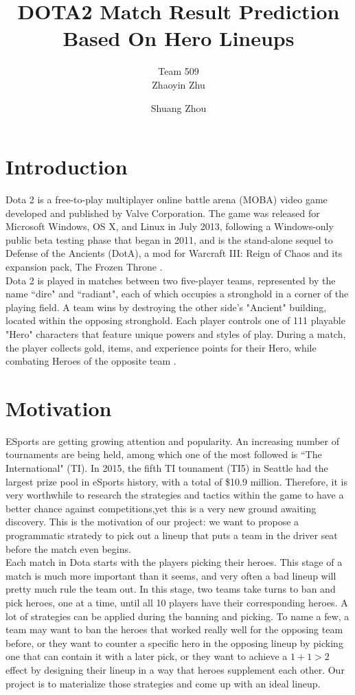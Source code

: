 \documentclass[11pt]{article}
\title{DOTA2 Match Result Prediction Based On Hero Lineups}
\author[1]{Team 509\\Zhaoyin Zhu}
\author[2]{Shuang Zhou}
\affil[1]{Division of Biostatistics, School of Medicine, New York University}
\affil[2]{Department of Computer Science, New York University}
\begin{document}
\maketitle

\section{Introduction}
Dota 2 is a free-to-play multiplayer online battle arena (MOBA) video game developed and published by Valve Corporation. The game was released for Microsoft Windows, OS X, and Linux in July 2013, following a Windows-only public beta testing phase that began in 2011, and is the stand-alone sequel to Defense of the Ancients (DotA), a mod for Warcraft III: Reign of Chaos and its expansion pack, The Frozen Throne \cite{dota2}.\\

\noindent Dota 2 is played in matches between two five-player teams, represented by the name ``dire" and ``radiant", each of which occupies a stronghold in a corner of the playing field. A team wins by destroying the other side's "Ancient" building, located within the opposing stronghold. Each player controls one of 111 playable "Hero" characters that feature unique powers and styles of play. During a match, the player collects gold, items, and experience points for their Hero, while combating Heroes of the opposite team \cite{dota2}.

\section{Motivation}
ESports are getting growing attention and popularity. An increasing number of tournaments are being held, among which one of the most followed is ``The International" (TI). In 2015, the fifth TI tounament (TI5) in Seattle had the largest prize pool in eSports history, with a total of \$10.9 million\cite{ti5}. Therefore, it is very worthwhile to research the strategies and tactics within the game to have a better chance against competitions,yet this is a very new ground awaiting discovery. This is the motivation of our project: we want to propose a programmatic stratedy to pick out a lineup that puts a team in the driver seat before the match even begins.\\

\noindent Each match in Dota starts with the players picking their heroes. This stage of a match is much more important than it seems, and very often a bad lineup will pretty much rule the team out. In this stage, two teams take turns to ban and pick heroes, one at a time, until all 10 players have their corresponding heroes. A lot of strategies can be applied during the banning and picking. To name a few, a team may want to ban the heroes that worked really well for the opposing team before, or they want to counter a specific hero in the opposing lineup by picking one that can contain it with a later pick, or they want to achieve a $1+1>2$ effect by designing their lineup in a way that heroes supplement each other. Our project is to materialize those strategies and come up with an ideal lineup.
\end{document}
